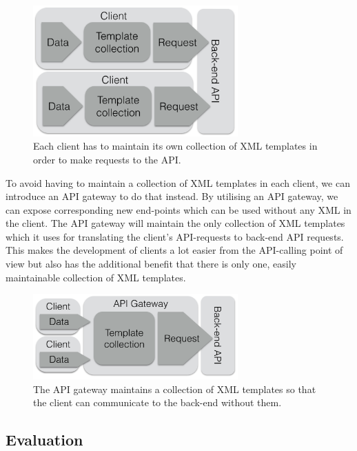 \documentclass{cslthse-msc}
\begin{document}
\begin{figure}[H]
  \centering
    \begin{center}
      \includegraphics[width=0.7\textwidth]{images/client_templates.png}
    \end{center}
  \caption{Each client has to maintain its own collection of XML templates in order to make requests to the API.}
\end{figure}

To avoid having to maintain a collection of XML templates in each client, we can introduce an API gateway to do that instead. By utilising an API gateway, we can expose corresponding new end-points which can be used without any XML in the client. The API gateway will maintain the only collection of XML templates which it uses for translating the client's API-requests to back-end API requests. This makes the development of clients a lot easier from the API-calling point of view but also has the additional benefit that there is only one, easily maintainable collection of XML templates.

\begin{figure}[H]
  \centering
    \begin{center}
      \includegraphics[width=0.7\textwidth]{images/gateway_templates.png}
    \end{center}
  \caption{The API gateway maintains a collection of XML templates so that the client can communicate to the back-end without them.}
\end{figure}

\subsection{Evaluation}
\end{document}
